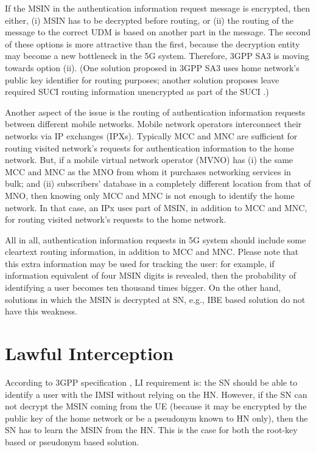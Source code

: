 \documentclass[conference]{IEEEtran}
\begin{document}
If the MSIN in the authentication information request message is encrypted, then either, (i) MSIN has to be decrypted before routing, or (ii) the routing of the message to the correct UDM is based on another part in the message. The second of these options is more attractive than the first, because the decryption entity may become a new bottleneck in the 5G system. Therefore, 3GPP SA3 is moving towards option (ii). (One solution proposed  in 3GPP SA3 uses home network's public key identifier for routing purposes; another solution proposes leave required SUCI routing information unencrypted as part of the SUCI \cite{S3180763}.)

Another aspect of the issue is the routing of authentication information requests between different mobile networks. Mobile network operators interconnect their networks via IP exchanges (IPXs). Typically MCC and MNC are sufficient for routing visited network's requests for authentication information to the home network. But, if a mobile virtual network operator  (MVNO) has (i) the same MCC and MNC as the MNO from whom it purchases networking services in bulk; and (ii) subscribers' database in a completely different location from that of MNO, then knowing only MCC and MNC is not enough to identify the home network. In that case, an IPx uses part of MSIN, in addition to MCC and MNC, for routing visited network's requests to the home network.

All in all, authentication information requests in 5G system should include some cleartext routing information, in addition to MCC and MNC. Please note that this extra information may be used for tracking the user: for example, if information equivalent of four MSIN digits is revealed, then the probability of identifying a user becomes ten thousand times bigger. On the other hand, solutions in which the MSIN is decrypted at SN, e.g., IBE based solution do not have this weakness.


\section{Lawful Interception} \label{section:LI}
According to 3GPP specification \cite{TS33106}, LI requirement is: the SN should be able to identify a user with the IMSI without relying on the HN. However, if the SN can not decrypt the MSIN coming from the UE (because it may be encrypted by the public key of the home network or be a pseudonym known to HN only), then the SN has to learn the MSIN from the HN. This is the case for both the root-key based or pseudonym based solution. 
\end{document}
